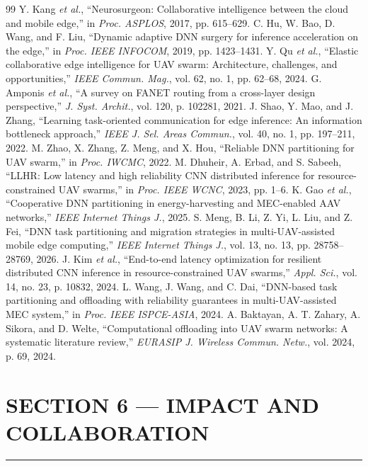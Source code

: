 \documentclass[11pt,a4paper]{article}
\begin{document}
\vspace{6pt}
{\footnotesize
\begin{thebibliography}{99}
\itemsep0pt \parskip0pt
 Y. Kang \emph{et al.}, ``Neurosurgeon: Collaborative intelligence between the cloud and mobile edge,'' in \emph{Proc. ASPLOS}, 2017, pp. 615--629.
 C. Hu, W. Bao, D. Wang, and F. Liu, ``Dynamic adaptive DNN surgery for inference acceleration on the edge,'' in \emph{Proc. IEEE INFOCOM}, 2019, pp. 1423--1431.
 Y. Qu \emph{et al.}, ``Elastic collaborative edge intelligence for UAV swarm: Architecture, challenges, and opportunities,'' \emph{IEEE Commun. Mag.}, vol. 62, no. 1, pp. 62--68, 2024.
 G. Amponis \emph{et al.}, ``A survey on FANET routing from a cross-layer design perspective,'' \emph{J. Syst. Archit.}, vol. 120, p. 102281, 2021.
 J. Shao, Y. Mao, and J. Zhang, ``Learning task-oriented communication for edge inference: An information bottleneck approach,'' \emph{IEEE J. Sel. Areas Commun.}, vol. 40, no. 1, pp. 197--211, 2022.
 M. Zhao, X. Zhang, Z. Meng, and X. Hou, ``Reliable DNN partitioning for UAV swarm,'' in \emph{Proc. IWCMC}, 2022.
 M. Dhuheir, A. Erbad, and S. Sabeeh, ``LLHR: Low latency and high reliability CNN distributed inference for resource-constrained UAV swarms,'' in \emph{Proc. IEEE WCNC}, 2023, pp. 1--6.
 K. Gao \emph{et al.}, ``Cooperative DNN partitioning in energy-harvesting and MEC-enabled AAV networks,'' \emph{IEEE Internet Things J.}, 2025.
 S. Meng, B. Li, Z. Yi, L. Liu, and Z. Fei, ``DNN task partitioning and migration strategies in multi-UAV-assisted mobile edge computing,'' \emph{IEEE Internet Things J.}, vol. 13, no. 13, pp. 28758--28769, 2026.
 J. Kim \emph{et al.}, ``End-to-end latency optimization for resilient distributed CNN inference in resource-constrained UAV swarms,'' \emph{Appl. Sci.}, vol. 14, no. 23, p. 10832, 2024.
 L. Wang, J. Wang, and C. Dai, ``DNN-based task partitioning and offloading with reliability guarantees in multi-UAV-assisted MEC system,'' in \emph{Proc. IEEE ISPCE-ASIA}, 2024.
 A. Baktayan, A. T. Zahary, A. Sikora, and D. Welte, ``Computational offloading into UAV swarm networks: A systematic literature review,'' \emph{EURASIP J. Wireless Commun. Netw.}, vol. 2024, p. 69, 2024.
\end{thebibliography}
}

\clearpage
\section*{\color{avblue}SECTION 6 --- IMPACT AND COLLABORATION}
\vspace{-4pt}\noindent\rule{\textwidth}{0.4pt}
\setcounter{section}{0}
\end{document}
